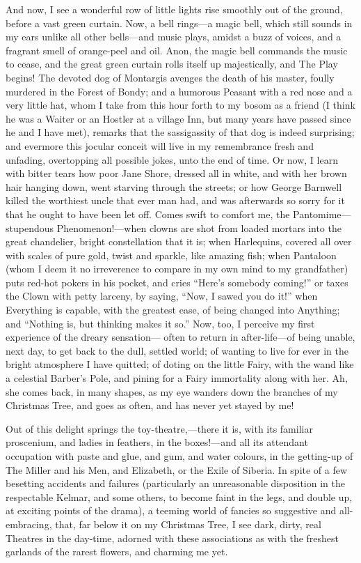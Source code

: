 And now, I see a wonderful row of little lights rise smoothly out of
the ground, before a vast green curtain.  Now, a bell rings---a magic
bell, which still sounds in my ears unlike all other bells---and
music plays, amidst a buzz of voices, and a fragrant smell of
orange-peel and oil.  Anon, the magic bell commands the music to
cease, and the great green curtain rolls itself up majestically, and
The Play begins!  The devoted dog of Montargis avenges the death of
his master, foully murdered in the Forest of Bondy; and a humorous
Peasant with a red nose and a very little hat, whom I take from this
hour forth to my bosom as a friend (I think he was a Waiter or an
Hostler at a village Inn, but many years have passed since he and I
have met), remarks that the sassigassity of that dog is indeed
surprising; and evermore this jocular conceit will live in my
remembrance fresh and unfading, overtopping all possible jokes, unto
the end of time.  Or now, I learn with bitter tears how poor Jane
Shore, dressed all in white, and with her brown hair hanging down,
went starving through the streets; or how George Barnwell killed the
worthiest uncle that ever man had, and was afterwards so sorry for
it that he ought to have been let off.  Comes swift to comfort me,
the Pantomime---stupendous Phenomenon!---when clowns are shot from
loaded mortars into the great chandelier, bright constellation that
it is; when Harlequins, covered all over with scales of pure gold,
twist and sparkle, like amazing fish; when Pantaloon (whom I deem it
no irreverence to compare in my own mind to my grandfather) puts
red-hot pokers in his pocket, and cries ``Here's somebody coming!'' or
taxes the Clown with petty larceny, by saying, ``Now, I sawed you do
it!'' when Everything is capable, with the greatest ease, of being
changed into Anything; and ``Nothing is, but thinking makes it so.''
Now, too, I perceive my first experience of the dreary sensation---%
often to return in after-life---of being unable, next day, to get
back to the dull, settled world; of wanting to live for ever in the
bright atmosphere I have quitted; of doting on the little Fairy,
with the wand like a celestial Barber's Pole, and pining for a Fairy
immortality along with her.  Ah, she comes back, in many shapes, as
my eye wanders down the branches of my Christmas Tree, and goes as
often, and has never yet stayed by me!

Out of this delight springs the toy-theatre,---there it is, with its
familiar proscenium, and ladies in feathers, in the boxes!---and all
its attendant occupation with paste and glue, and gum, and water
colours, in the getting-up of The Miller and his Men, and Elizabeth,
or the Exile of Siberia.  In spite of a few besetting accidents and
failures (particularly an unreasonable disposition in the
respectable Kelmar, and some others, to become faint in the legs,
and double up, at exciting points of the drama), a teeming world of
fancies so suggestive and all-embracing, that, far below it on my
Christmas Tree, I see dark, dirty, real Theatres in the day-time,
adorned with these associations as with the freshest garlands of the
rarest flowers, and charming me yet.

